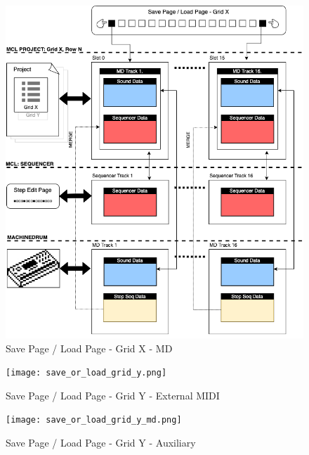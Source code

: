 \begin{figure}
    \centering
    \includegraphics[scale=0.7]{save_or_load_grid_x.png}
    \caption{Save Page / Load Page - Grid X - MD }
    \label{fig:my_label}
\end{figure}
\begin{figure}
    \centering
    \texttt{[image: save\_or\_load\_grid\_y.png]}
    \caption{Save Page / Load Page - Grid Y - External MIDI}
    \label{fig:my_label}
\end{figure}
\begin{figure}
    \centering
    \texttt{[image: save\_or\_load\_grid\_y\_md.png]}
    \caption{Save Page / Load Page - Grid Y - Auxiliary}
    \label{fig:my_label}
\end{figure}
